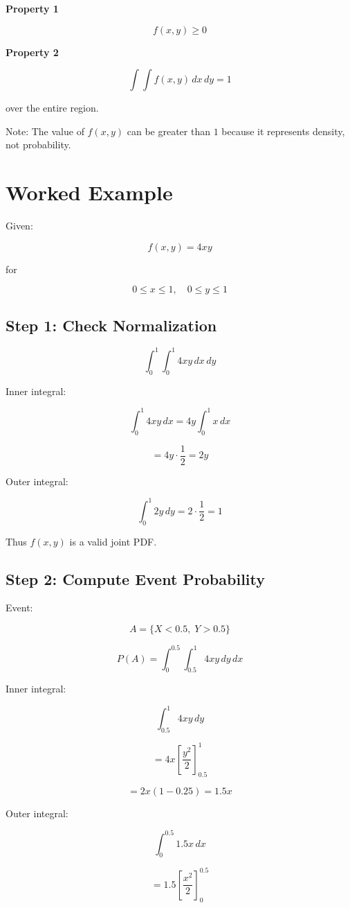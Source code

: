 \documentclass[12pt,a4paper]{article}
\begin{document}
\textbf{Property 1}

\[
f(x,y) \ge 0
\]

\textbf{Property 2}

\[
\int\int f(x,y)\,dx\,dy = 1
\]

over the entire region.

Note: The value of $f(x,y)$ can be greater than $1$ because it represents density, not probability.

\section{Worked Example}

Given:

\[
f(x,y)=4xy
\]

for

\[
0 \le x \le 1, \quad 0 \le y \le 1
\]

\subsection{Step 1: Check Normalization}

\[
\int_0^1 \int_0^1 4xy \, dx\,dy
\]

Inner integral:

\[
\int_0^1 4xy\,dx = 4y\int_0^1 x\,dx
\]

\[
=4y \cdot \frac{1}{2}=2y
\]

Outer integral:

\[
\int_0^1 2y\,dy = 2\cdot\frac{1}{2}=1
\]

Thus $f(x,y)$ is a valid joint PDF.

\subsection{Step 2: Compute Event Probability}

Event:

\[
A = \{X<0.5,\;Y>0.5\}
\]

\[
P(A)=\int_0^{0.5}\int_{0.5}^{1}4xy\,dy\,dx
\]

Inner integral:

\[
\int_{0.5}^{1}4xy\,dy
\]

\[
=4x\left[\frac{y^2}{2}\right]_{0.5}^{1}
\]

\[
=2x(1-0.25)=1.5x
\]

Outer integral:

\[
\int_0^{0.5}1.5x\,dx
\]

\[
=1.5\left[\frac{x^2}{2}\right]_0^{0.5}
\]
\end{document}
